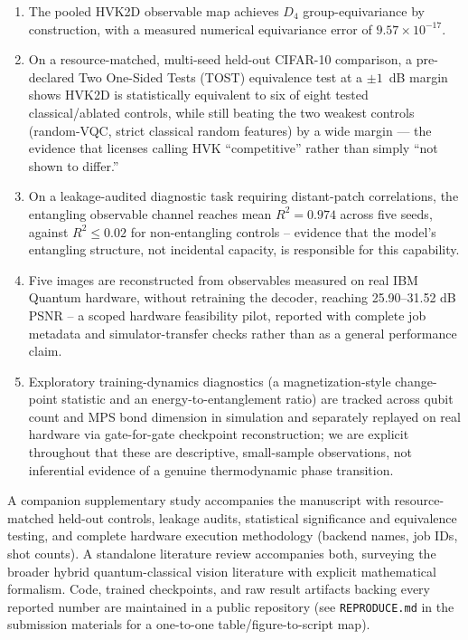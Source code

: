 \documentclass[11pt]{article}
\begin{document}
\begin{enumerate}
\item The pooled HVK2D observable map achieves $D_4$ group-equivariance by construction, with a measured numerical equivariance error of $9.57 \times 10^{-17}$.
\item On a resource-matched, multi-seed held-out CIFAR-10 comparison, a pre-declared Two One-Sided Tests (TOST) equivalence test at a $\pm1$~dB margin shows HVK2D is statistically equivalent to six of eight tested classical/ablated controls, while still beating the two weakest controls (random-VQC, strict classical random features) by a wide margin --- the evidence that licenses calling HVK ``competitive'' rather than simply ``not shown to differ.''
\item On a leakage-audited diagnostic task requiring distant-patch correlations, the entangling observable channel reaches mean $R^2 = 0.974$ across five seeds, against $R^2 \leq 0.02$ for non-entangling controls -- evidence that the model's entangling structure, not incidental capacity, is responsible for this capability.
\item Five images are reconstructed from observables measured on real IBM Quantum hardware, without retraining the decoder, reaching 25.90--31.52 dB PSNR -- a scoped hardware feasibility pilot, reported with complete job metadata and simulator-transfer checks rather than as a general performance claim.
\item Exploratory training-dynamics diagnostics (a magnetization-style change-point statistic and an energy-to-entanglement ratio) are tracked across qubit count and MPS bond dimension in simulation and separately replayed on real hardware via gate-for-gate checkpoint reconstruction; we are explicit throughout that these are descriptive, small-sample observations, not inferential evidence of a genuine thermodynamic phase transition.
\end{enumerate}

\smallskip
\noindent A companion supplementary study accompanies the manuscript with resource-matched held-out controls, leakage audits, statistical significance and equivalence testing, and complete hardware execution methodology (backend names, job IDs, shot counts). A standalone literature review accompanies both, surveying the broader hybrid quantum-classical vision literature with explicit mathematical formalism. Code, trained checkpoints, and raw result artifacts backing every reported number are maintained in a public repository (see \texttt{REPRODUCE.md} in the submission materials for a one-to-one table/figure-to-script map).
\end{document}
